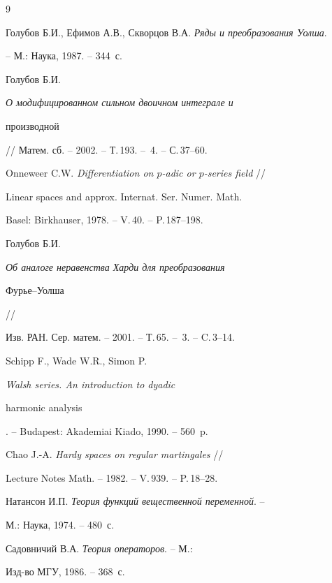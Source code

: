 \begin{thebibliography}{9}







Голубов Б.И., Ефимов А.В., Скворцов В.А. {\em Ряды и преобразования Уолша}.


-- М.: Наука, 1987. -- 344~с.




Голубов Б.И. {\em О модифицированном сильном двоичном интеграле и 


производной} // Матем. сб. -- 2002. -- Т.\,193. -- \No\,4. -- С.\,37--60.




Onneweer C.W. {\em Differentiation on $p$-adic or $p$-series field} //


Linear spaces and approx. Internat. Ser. Numer. Math. 


Basel: Birkhauser, 1978. -- V.\,40. -- P.\,187--198.




Голубов Б.И. {\em Об аналоге неравенства Харди для преобразования


Фурье--Уолша} //


Изв. РАН. Сер. матем. -- 2001. -- Т.\,65. -- \No\,3. -- C.\,3--14.




Schipp F., Wade W.R., Simon P. {\em Walsh series. An introduction to dyadic 


harmonic analysis}. -- Budapest: Akademiai Kiado, 1990. -- 560~p.




Chao J.-A. {\em Hardy spaces on regular martingales} //




Lecture Notes Math. -- 1982. -- V.\,939. -- P.\,18--28.




Натансон И.П. {\em Теория функций вещественной переменной}. --


М.: Наука, 1974. -- 480~с.




Садовничий В.А. {\em Теория операторов}. -- М.:


Изд-во МГУ, 1986. -- 368~с. 








\end{thebibliography}





\vskip 2cm












\label{end}






